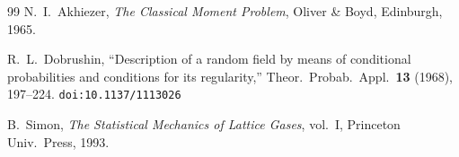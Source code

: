 \documentclass[11pt,a4paper]{article}
\theoremstyle{plain}
\theoremstyle{definition}
\theoremstyle{remark}
\begin{document}
\begin{thebibliography}{99}
 N.~I.~Akhiezer,
  \emph{The Classical Moment Problem},
  Oliver \& Boyd, Edinburgh, 1965.

 R.~L.~Dobrushin,
  ``Description of a random field by means of conditional
  probabilities and conditions for its regularity,''
  Theor.\ Probab.\ Appl.\ \textbf{13} (1968), 197--224.
  \texttt{doi:10.1137/1113026}

 B.~Simon,
  \emph{The Statistical Mechanics of Lattice Gases},
  vol.~I, Princeton Univ.\ Press, 1993.

\end{thebibliography}
\end{document}
